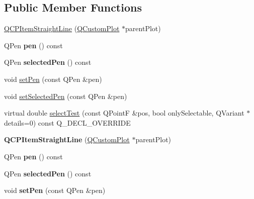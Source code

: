 \subsection*{Public Member Functions}
\begin{DoxyCompactItemize}
\item 
\hyperlink{class_q_c_p_item_straight_line_a41fd2e1f006983449eca9830930c3b10}{Q\+C\+P\+Item\+Straight\+Line} (\hyperlink{class_q_custom_plot}{Q\+Custom\+Plot} $\ast$parent\+Plot)
\item 
Q\+Pen {\bfseries pen} () const \hypertarget{class_q_c_p_item_straight_line_ad858ab1a444391aab778f765453ea222}{}\label{class_q_c_p_item_straight_line_ad858ab1a444391aab778f765453ea222}

\item 
Q\+Pen {\bfseries selected\+Pen} () const \hypertarget{class_q_c_p_item_straight_line_a9e33ae966a7e2ea1083b3b9aeabeaea5}{}\label{class_q_c_p_item_straight_line_a9e33ae966a7e2ea1083b3b9aeabeaea5}

\item 
void \hyperlink{class_q_c_p_item_straight_line_a9f36c9c9e60d7d9ac084c80380ac8601}{set\+Pen} (const Q\+Pen \&pen)
\item 
void \hyperlink{class_q_c_p_item_straight_line_a5c33559498d33543fa95cf0a36e851ff}{set\+Selected\+Pen} (const Q\+Pen \&pen)
\item 
virtual double \hyperlink{class_q_c_p_item_straight_line_a2e36c9d4dcc3aeda78a5584f790e39e3}{select\+Test} (const Q\+PointF \&pos, bool only\+Selectable, Q\+Variant $\ast$details=0) const Q\+\_\+\+D\+E\+C\+L\+\_\+\+O\+V\+E\+R\+R\+I\+DE
\item 
{\bfseries Q\+C\+P\+Item\+Straight\+Line} (\hyperlink{class_q_custom_plot}{Q\+Custom\+Plot} $\ast$parent\+Plot)\hypertarget{class_q_c_p_item_straight_line_a41fd2e1f006983449eca9830930c3b10}{}\label{class_q_c_p_item_straight_line_a41fd2e1f006983449eca9830930c3b10}

\item 
Q\+Pen {\bfseries pen} () const \hypertarget{class_q_c_p_item_straight_line_ad858ab1a444391aab778f765453ea222}{}\label{class_q_c_p_item_straight_line_ad858ab1a444391aab778f765453ea222}

\item 
Q\+Pen {\bfseries selected\+Pen} () const \hypertarget{class_q_c_p_item_straight_line_a9e33ae966a7e2ea1083b3b9aeabeaea5}{}\label{class_q_c_p_item_straight_line_a9e33ae966a7e2ea1083b3b9aeabeaea5}

\item 
void {\bfseries set\+Pen} (const Q\+Pen \&pen)\hypertarget{class_q_c_p_item_straight_line_a9f36c9c9e60d7d9ac084c80380ac8601}{}\label{class_q_c_p_item_straight_line_a9f36c9c9e60d7d9ac084c80380ac8601}


\end{DoxyCompactItemize}
